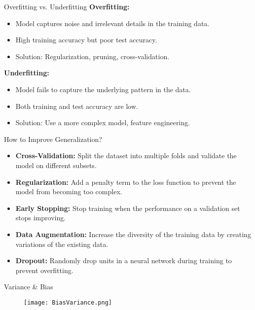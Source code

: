 \documentclass[serif, aspectratio=169]{beamer}
\begin{document}
\begin{frame}{Overfitting vs. Underfitting}
\textbf{Overfitting:}
\begin{itemize}
    \item Model captures noise and irrelevant details in the training data.
    \item High training accuracy but poor test accuracy.
    \item Solution: Regularization, pruning, cross-validation.
\end{itemize}


\textbf{Underfitting:}
\begin{itemize}
    \item Model fails to capture the underlying pattern in the data.
    \item Both training and test accuracy are low.
    \item Solution: Use a more complex model, feature engineering.
\end{itemize}
\end{frame}

\begin{frame}{How to Improve Generalization?}
\begin{itemize}
    \item \textbf{Cross-Validation:} Split the dataset into multiple folds and validate the model on different subsets.
    \item \textbf{Regularization:} Add a penalty term to the loss function to prevent the model from becoming too complex.
    \item \textbf{Early Stopping:} Stop training when the performance on a validation set stops improving.
    \item \textbf{Data Augmentation:} Increase the diversity of the training data by creating variations of the existing data.
    \item \textbf{Dropout:} Randomly drop units in a neural network during training to prevent overfitting.
\end{itemize}
\end{frame}

\begin{frame}{Variance & Bias}
    \begin{figure}[h]
        \centering
        \texttt{[image: BiasVariance.png]} 
    \end{figure}
\end{frame}
\end{document}
